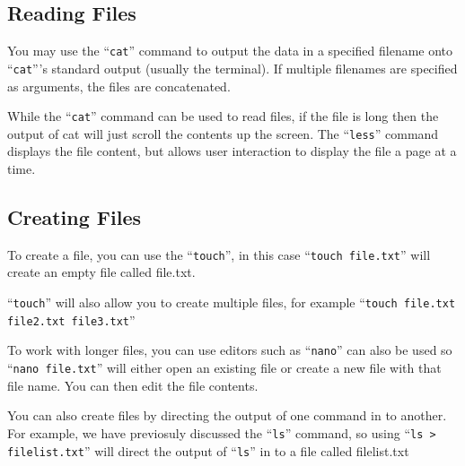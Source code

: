 \documentclass{extbook}
\begin{document}
\subsection{Reading Files}

You may use the ``\verb|cat|'' command to output the data in a specified filename onto ``\verb|cat|'''s standard output (usually the terminal).  If multiple filenames are specified as arguments, the files are concatenated.

While the ``\verb|cat|'' command can be used to read files, if the file is long then the output of cat will just scroll the contents up the screen.  The ``\verb|less|'' command displays the file content, but allows user interaction to display the file a page at a time.

\subsection{Creating Files}

To create a file, you can use the ``\verb|touch|'', in this case ``\verb|touch file.txt|'' will create an empty file called file.txt.

``\verb|touch|'' will also allow you to create multiple files, for example ``\verb|touch file.txt file2.txt file3.txt|''

To work with longer files, you can use editors such as ``\verb|nano|'' can also be used so ``\verb|nano file.txt|'' will either open an existing file or create a new file with that file name.   You can then edit the file contents.

You can also create files by directing the output of one command in to another.  For example, we have previosuly discussed the ``\verb|ls|'' command, so using ``\verb|ls > filelist.txt|'' will direct the output of ``\verb|ls|'' in to a file called filelist.txt
\end{document}
